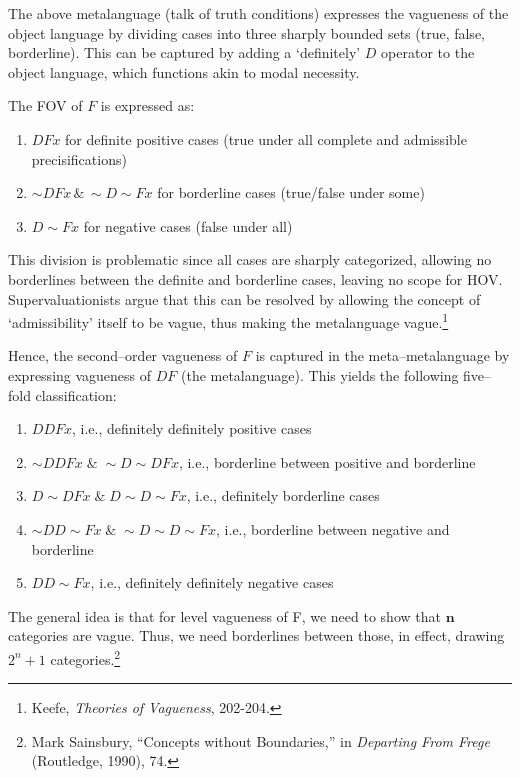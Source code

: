 The above metalanguage (talk of truth conditions) expresses the
vagueness of the object language by dividing cases into three sharply
bounded sets (true, false, borderline). This can be captured by adding a
`definitely' $D$ operator to the object language, which functions akin to
modal necessity.

The FOV of $F$ is expressed as:

\begin{enumerate}
\def\labelenumi{(\arabic{enumi})}
\item
  $DFx$ for definite positive cases (true under all complete and
  admissible precisifications)
\item
  ${\sim} DFx \, \& \, {\sim} D {\sim} Fx$ for borderline cases (true/false
  under some)
\item
  $D {\sim} Fx$ for negative cases (false under all)
\end{enumerate}

This division is problematic since all cases are sharply categorized,
allowing no borderlines between the definite and borderline cases,
leaving no scope for HOV. Supervaluationists argue that this can be
resolved by allowing the concept of `admissibility' itself to be vague,
thus making the metalanguage vague.\footnote{Keefe, \emph{Theories of
  Vagueness}, 202-204.}

Hence, the second--order vagueness of $F$ is captured in the
meta--metalanguage by expressing vagueness of $DF$ (the metalanguage). This
yields the following five--fold classification:

\begin{enumerate}
\def\labelenumi{(\arabic{enumi})}
\item
  $DDFx$, i.e., definitely definitely positive cases
\item
  ${\sim} DDFx \; \& \; {\sim} D {\sim} DFx$, i.e., borderline between positive
  and borderline
\item
  $D {\sim} DFx \; \& \; D{\sim} D{\sim} Fx$, i.e., definitely borderline cases
\item
  ${\sim}DD{\sim} Fx \; \& \; {\sim}D{\sim}D{\sim}Fx$, i.e., borderline between
  negative and borderline
\item
  $DD{\sim}Fx$, i.e., definitely definitely negative cases
\end{enumerate}

The general idea is that for  level vagueness of F, we need
to show that $\mathbf{n}$ categories are vague. Thus, we need borderlines
between those, in effect, drawing $2^n+1$ categories.\footnote{Mark
  Sainsbury, ``Concepts without Boundaries,'' in \emph{Departing From
  Frege} (Routledge, 1990), 74.}

